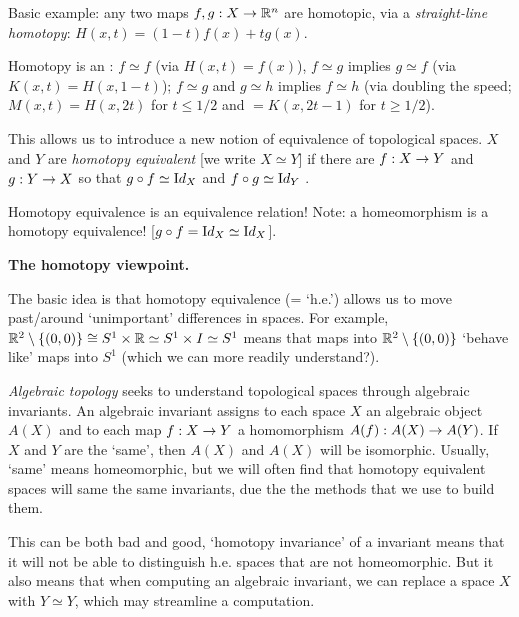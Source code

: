 \documentclass[12pt]{article}
\begin{document}
\ssk

Basic example: any two maps $f,g:X\rightarrow {\mathbb R}^n$ are homotopic, via a
{\it straight-line homotopy}: $H(x,t)=(1-t)f(x)+tg(x)$.

\msk

Homotopy is an  : $f\simeq f$  (via $H(x,t)=f(x)$),
$f\simeq g$ implies $g\simeq f$ (via $K(x,t)=H(x,1-t)$); 
$f\simeq g$ and $g\simeq h$ implies $f\simeq h$ (via doubling the speed;
$M(x,t)=H(x,2t)$ for $t\leq 1/2$ and $=K(x,2t-1)$ for $t\geq 1/2$).

\ssk

This allows us to introduce a new notion of equivalence of topological spaces.
$X$ and $Y$ are {\it homotopy equivalent} [we write $X\simeq Y$]
if there are $f:X\rightarrow Y$ and $g:Y\rightarrow X$ so that $g\circ f\simeq {\textrm Id}_X$
and $f\circ g\simeq{\textrm Id}_Y$ . 

\ssk

Homotopy equivalence is an equivalence relation! Note: a homeomorphism is a
homotopy equivalence! [$g\circ f = {\textrm Id}_X\simeq {\textrm Id}_X$].

\msk

{\bf The homotopy viewpoint.}

\ssk

The basic idea is that homotopy equivalence  (= `h.e.') 
allows us to move past/around
`unimportant' differences in spaces. For example, 
${\mathbb R}^2\setminus\{(0,0)\}\cong S^1\times{\mathbb R}\simeq S^1\times I\simeq S^1$
means that maps into ${\mathbb R}^2\setminus\{(0,0)\}$ `behave like' maps
into $S^1$ (which we can more readily understand?).

\ssk

{\it Algebraic topology} seeks to understand topological spaces through
algebraic invariants. An algebraic invariant assigns to each space $X$ an 
algebraic object $A(X)$ and to each map $f:X\rightarrow Y$ a 
homomorphism $A(f):A(X)\rightarrow A(Y)$. If $X$ and $Y$ are the `same', then 
$A(X)$ and $A(X)$ will be isomorphic. Usually, `same' means homeomorphic,
but we will often find that homotopy equivalent spaces will 
same the same invariants, due the the methods that we use to build 
them.

\ssk

This can be both bad and good, `homotopy invariance' of a invariant means
that it will not be able to distinguish h.e. spaces that are not homeomorphic.
But it also means that when computing an algebraic invariant, we can replace
a space $X$ with $Y\simeq Y$, which may streamline a computation.
\end{document}
